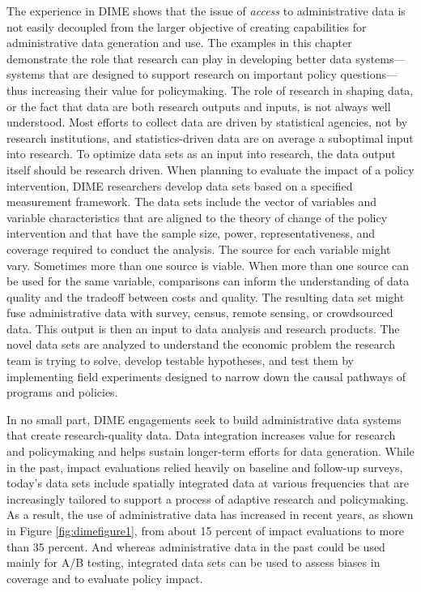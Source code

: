 The experience in DIME shows that the issue of \emph{access} to administrative data is not easily decoupled from the larger objective of creating capabilities for administrative data generation and use. The examples in this chapter demonstrate the role that research can play in developing better data systems---systems that are designed to support research on important policy questions---thus increasing their value for policymaking. The role of research in shaping data, or the fact that data are both research outputs and inputs, is not always well understood. Most efforts to collect data are driven by statistical agencies, not by research institutions, and statistics-driven data are on average a suboptimal input into research. To optimize data sets as an input into research, the data output itself should be research driven. When planning to evaluate the impact of a policy intervention, DIME researchers develop data sets based on a specified measurement framework. The data sets include the vector of variables and variable characteristics that are aligned to the theory of change of the policy intervention and that have the sample size, power, representativeness, and coverage required to conduct the analysis. The source for each variable might vary. Sometimes more than one source is viable. When more than one source can be used for the same variable, comparisons can inform the understanding of data quality and the tradeoff between costs and quality. The resulting data set might fuse administrative data with survey, census, remote sensing, or crowdsourced data. This output is then an input to data analysis and research products. The novel data sets are analyzed to understand the economic problem the research team is trying to solve, develop testable hypotheses, and test them by implementing field experiments designed to narrow down the causal pathways of programs and policies.

In no small part, DIME engagements seek to build administrative data systems that create research-quality data. Data integration increases value for research and policymaking and helps sustain longer-term efforts for data generation. While in the past, impact evaluations relied heavily on baseline and follow-up surveys, today's data sets include spatially integrated data at various frequencies that are increasingly tailored to support a process of adaptive research and policymaking. As a result, the use of administrative data has increased in recent years, as shown in Figure \ref{fig:dimefigure1}, from about 15 percent of impact evaluations to more than 35 percent. And whereas administrative data in the past could be used mainly for A/B testing, integrated data sets can be used to assess biases in coverage and to evaluate policy impact.

